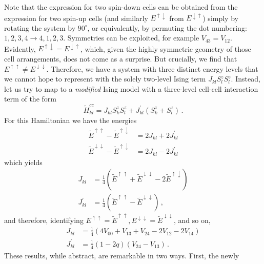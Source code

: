 Note that the expression for two spin-down cells can be obtained from the
expression for two spin-up cells (and similarly $E^{\uparrow\downarrow}$ from
$E^{\downarrow\uparrow}$) simply by rotating the system by $90^{\circ}$, or
equivalently, by permuting the dot numbering: $1,2,3,4 \rightarrow 4,1,2,3$.
Symmetries can be exploited, for example $V_{43} = V_{12}$. Evidently,
$E^{\uparrow\downarrow} = E^{\downarrow\uparrow}$, which, given the highly
symmetric geometry of those cell arrangements, does not come as a surprise. But
crucially, we find that $E^{\uparrow\uparrow} \ne E^{\downarrow\downarrow}$.
Therefore, we have a system with three distinct energy levels that we cannot
hope to represent with the solely two-level Ising term $J_{kl} S^z_l S^z_l$.
Instead, let us try to map to a \emph{modified} Ising model with a three-level
cell-cell interaction term of the form
%
\begin{equation}
  \label{eq:Ising_term}
  \tilde{H}^{cc}_{kl}
  = 
  J_{kl} S^z_k S^z_l + 
  J^{\prime}_{kl} \left( S^z_k + S^z_l \right) \, .
\end{equation}
%
For this Hamiltonian we have the energies
%
\begin{align}
  \tilde{E}^{\uparrow\uparrow} - \tilde{E}^{\uparrow\downarrow}
  &=
  2J_{kl} + 2J^{\prime}_{kl} \\
  \tilde{E}^{\downarrow\downarrow} - \tilde{E}^{\uparrow\downarrow}
  &=
  2J_{kl} - 2J^{\prime}_{kl}
\end{align}
%
which yields
%
\begin{align}
  \label{eq:Js_from_Es}
  J_{kl}
  &=
  \frac{1}{4} 
  \left( 
    \tilde{E}^{\uparrow\uparrow} + \tilde{E}^{\downarrow\downarrow}
    - 2 \tilde{E}^{\uparrow\downarrow} 
  \right) \\
  J^{\prime}_{kl}
  &=
  \frac{1}{4}
  \left( \tilde{E}^{\uparrow\uparrow} - \tilde{E}^{\downarrow\downarrow} \right) \, ,
\end{align}
%
and therefore, identifying $E^{\uparrow\uparrow} = \tilde{E}^{\uparrow\uparrow},
E^{\downarrow\downarrow} = \tilde{E}^{\downarrow\downarrow}$, and so on,
\begin{align}
  \label{eq:J}
  J_{kl}
  &=
  \frac{1}{4} 
  \left(
    4 V_{00} + V_{13} + V_{24} - 2 V_{12} - 2 V_{14}
  \right) \\
  \label{eq:Jprime}
  J^{\prime}_{kl}
  &=
  \frac{1}{4}
  \left( 1 - 2 q \right)
  \left( V_{24} - V_{13} \right) \, .
\end{align}
These results, while abstract, are remarkable in two ways. First, the newly
